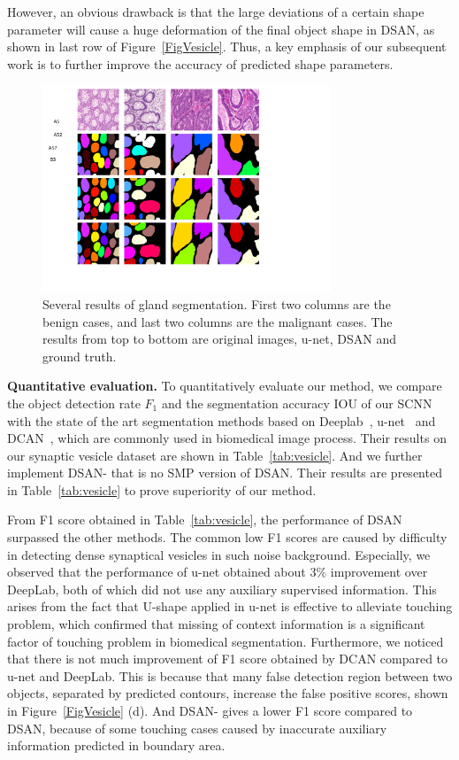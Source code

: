 However, an obvious drawback is that the large deviations of a certain shape parameter will cause a huge deformation of the final object shape in DSAN, as shown in last row of Figure~\ref{FigVesicle}.
Thus, a key emphasis of our subsequent work is to further improve the accuracy of predicted shape parameters.

\begin{figure}
    \begin{center}
        \includegraphics[width=3.4in]{figures/FigGland.pdf}
    \end{center}
    \caption{Several results of gland segmentation. 
    First two columns are the benign cases, and last two columns are the malignant cases.
    The results from top to bottom are original images, u-net, DSAN and ground truth.}
    \label{FigGland}
\end{figure}
\noindent\textbf{Quantitative evaluation.}
To quantitatively evaluate our method, we compare the object detection rate $F_1$ and the segmentation accuracy IOU of our SCNN with the state of the art segmentation methods based on Deeplab~\cite{Chen2014a}, u-net~\cite{Ronneberger2015} and DCAN~\cite{Chen2016b}, which are commonly used in biomedical image process.
Their results on our synaptic vesicle dataset are shown in Table~\ref{tab:vesicle}.
And we further implement DSAN- that is no SMP version of DSAN.
Their results are presented in Table~\ref{tab:vesicle} to prove superiority of our method.

From F1 score obtained in Table~\ref{tab:vesicle}, the performance of DSAN surpassed the other methods.
The common low F1 scores are caused by difficulty in detecting dense synaptical vesicles in such noise background.
Especially, we observed that the performance of u-net obtained about $3\%$ improvement over DeepLab, both of which did not use any auxiliary supervised information.
This arises from the fact that U-shape applied in u-net is effective to alleviate touching problem, which confirmed that missing of context information is a significant factor of touching problem in biomedical segmentation.
Furthermore, we noticed that there is not much improvement of F1 score obtained by DCAN compared to u-net and DeepLab.
This is because that many false detection region between two objects, separated by predicted contours, increase the false positive scores, shown in Figure~\ref{FigVesicle} (d).
And DSAN- gives a lower F1 score compared to DSAN, because of some touching cases caused by inaccurate auxiliary information predicted in boundary area.

